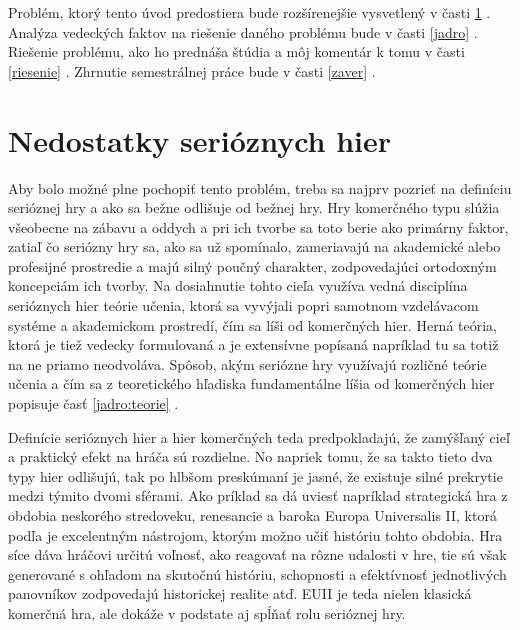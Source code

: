 \documentclass[10pt,twoside,slovak,a4paper]{article}
\begin{document}
Problém, ktorý tento úvod predostiera bude rozšírenejšie vysvetlený v časti \ref{problem} .
Analýza vedeckých faktov na riešenie daného problému bude v časti \ref{jadro} .
Riešenie problému, ako ho prednáša štúdia \cite{natucci2021experience} a môj komentár k tomu v časti \ref{riesenie}  .
Zhrnutie semestrálnej práce bude v časti \ref{zaver} .

\section{Nedostatky serióznych hier} \label{problem}
Aby bolo možné plne pochopiť tento problém, treba sa najprv pozrieť na definíciu serióznej hry a ako sa bežne odlišuje od bežnej hry. Hry komerčného typu slúžia všeobecne na zábavu a oddych a pri ich tvorbe sa toto berie ako primárny faktor, zatiaľ čo seriózny hry sa, ako sa už spomínalo, zameriavajú na akademické alebo profesijné prostredie a majú silný poučný charakter, zodpovedajúci ortodoxným koncepciám ich tvorby. Na dosiahnutie tohto cieľa využíva vedná disciplína serióznych hier teórie učenia, ktorá sa vyvýjali popri samotnom vzdelávacom systéme a akademickom prostredí, čím sa líši od komerčných hier. Herná teória, ktorá je tiež vedecky formulovaná a je extensívne popísaná napríklad tu \cite{owen2013game} sa totiž na ne priamo neodvoláva. Spôsob, akým seriózne hry využívajú rozličné teórie učenia a čím sa z teoretického hľadiska fundamentálne líšia od komerčných hier popisuje časť \ref{jadro:teorie} . 

Definície serióznych hier a hier komerčných teda predpokladajú, že zamýšľaný cieľ a praktický efekt na hráča sú rozdielne. No napriek tomu, že sa takto tieto dva typy hier odlišujú, tak po hlbšom preskúmaní je jasné, že existuje silné prekrytie medzi týmito dvomi sférami. Ako príklad sa dá uviesť napríklad strategická hra z obdobia neskorého stredoveku, renesancie a baroka Europa Universalis II, ktorá podľa \cite{egenfeldt2012europa} je excelentným nástrojom, ktorým možno učiť históriu tohto obdobia. Hra síce dáva hráčovi určitú voľnosť, ako reagovať na rôzne udalosti v hre, tie sú však generované s ohľadom na skutočnú históriu, schopnosti a efektívnosť jednotlivých panovníkov zodpovedajú historickej realite atď. EUII je teda nielen klasická komerčná hra, ale dokáže v podstate aj spĺňať rolu serióznej hry.
\end{document}
